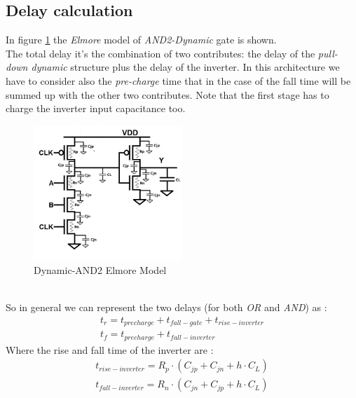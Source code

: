 \documentclass[12pt,  english, makeidx, a4paper, titlepage, oneside]{article}
\begin{document}
\subsection{Delay calculation}
In figure \ref{fig:nand_2_dyn} the \textit{Elmore} model of \textit{AND2-Dynamic} gate is shown.\\  
The total delay it's the combination of two contributes: the delay of the \textit{pull-down dynamic} structure plus the delay of the inverter. In this architecture we have to consider also the \textit{pre-charge} time that in the case of the fall time will be summed up with the other two contributes. Note that the first stage has to charge the inverter input capacitance too.\\
\begin{figure}[htbp]
	\begin{center}
		\includegraphics[width=0.5\textwidth]{img/NAND2_DynLogic_Delay.jpg}
		\caption{Dynamic-AND2 Elmore Model}
		\label{fig:nand_2_dyn}
	\end{center}
\end{figure}\\
So in general we can represent the two delays (for both \textit{OR} and \textit{AND}) as :
\begin{equation}
\begin{gathered}
t_r = t_{precharge} + t_{fall-gate} + t_{rise-inverter}\\
t_f = t_{precharge}  + t_{fall-inverter}
\end{gathered}
\end{equation}
Where the rise and fall time of the inverter are :\\
\begin{equation}
\begin{gathered}
t_{rise-inverter} =  R_p \cdot ( C_{jp} +  C_{jn} + h\cdot C_L )\\
t_{fall-inverter} =  R_n \cdot ( C_{jn} +  C_{jp} + h\cdot C_L )
\end{gathered}
\end{equation}
\end{document}
